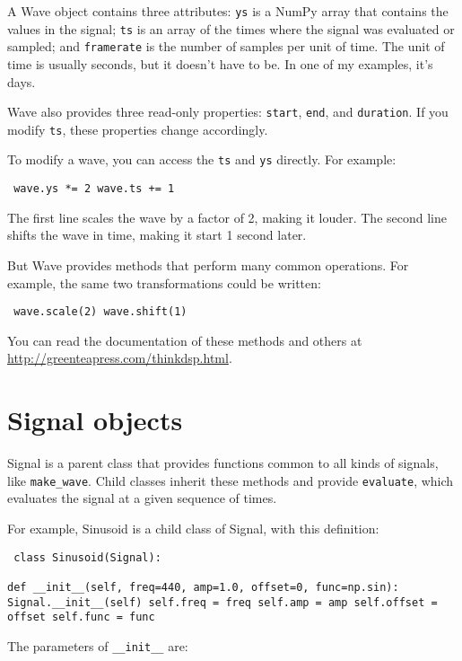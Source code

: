 \documentclass[12pt]{book} \usepackage[width=5.5in,height=8.5in, hmarginratio=3:2,vmarginratio=1:1]{geometry}
\begin{document}
A Wave object contains three attributes: {\tt ys} is a NumPy array that contains the values in the signal; {\tt ts} is an array of the times where the signal was evaluated or sampled; and {\tt framerate} is the number of samples per unit of time. The unit of time is usually seconds, but it doesn't have to be. In one of my examples, it's days. 

Wave also provides three read-only properties: {\tt start}, {\tt end}, and {\tt duration}. If you modify {\tt ts}, these properties change accordingly. 

To modify a wave, you can access the {\tt ts} and {\tt ys} directly. For example: 

\begin{verbatim} wave.ys *= 2 wave.ts += 1 \end{verbatim} 

The first line scales the wave by a factor of 2, making it louder. The second line shifts the wave in time, making it start 1 second later. 

But Wave provides methods that perform many common operations. For example, the same two transformations could be written: 

\begin{verbatim} wave.scale(2) wave.shift(1) \end{verbatim} 

You can read the documentation of these methods and others at \url{http://greenteapress.com/thinkdsp.html}. 

\section{Signal objects} \label{sigobs} 

Signal is a parent class that provides functions common to all kinds of signals, like \verb"make_wave". Child classes inherit these methods and provide {\tt evaluate}, which evaluates the signal at a given sequence of times. 

For example, Sinusoid is a child class of Signal, with this definition: 

\begin{verbatim} class Sinusoid(Signal): 

def __init__(self, freq=440, amp=1.0, offset=0, func=np.sin): Signal.__init__(self) self.freq = freq self.amp = amp self.offset = offset self.func = func \end{verbatim} 

The parameters of \verb"__init__" are: 
\end{document}
